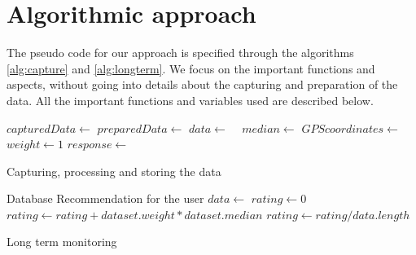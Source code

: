 \section{Algorithmic approach}
\indent					%
\indent
The pseudo code for our approach is specified through the algorithms \ref{alg:capture} and \ref{alg:longterm}.
We focus on the important functions and aspects, without going into details about the capturing and preparation of the data.
All the important functions and variables used are described below.
\begin{algorithm}[htbp]
	\begin{algorithmic}[1]
		\Repeat
		\State $capturedData \gets$ 
		\State $preparedData \gets$ 
		\State $data \gets$  
		\EndFor
		\State $median \gets$  
		\State $GPScoordinates \gets$ 
		\State $weight \gets 1$  
			\State $response \gets$ 
			 
				\State {}
			\Else
				\State {}			\EndIf
		\EndIf
				
		\State {} 
		\State {}	
	\end{algorithmic}
	\caption{Capturing, processing and storing the data}
	\label{alg:capture}
\end{algorithm}
\begin{algorithm}[htbp]
	\begin{algorithmic}[1]	
		\Require Database
		\Ensure Recommendation for the user
		\Repeat
		\State $data \gets$ 
		\State $rating \gets 0$	
		 
		\State $rating \gets rating + dataset.weight * dataset.median$
		\EndFor
		\State $rating \gets rating / data.length$ 
			\State {}
		\EndIf
		\Until{}
	\end{algorithmic}
	\caption{Long term monitoring}
	\label{alg:longterm}
\end{algorithm}

